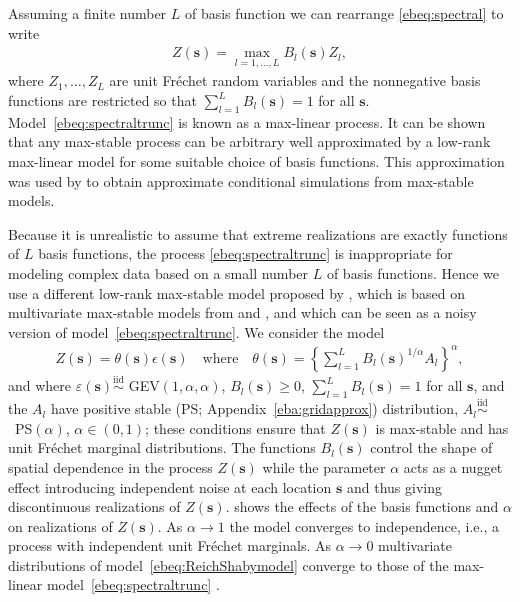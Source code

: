 \documentclass[12pt]{article}
\newcommand{\bs}{\ensuremath{\mathbf{s}}}
\newcommand{\iid}{\stackrel{\mathrm{iid}}{\sim}}
\newcommand{\aref}[1]{Appendix~\ref{#1}}
\begin{document}
Assuming a finite number $L$ of basis function we can rearrange \eqref{ebeq:spectral} to write
\begin{align} \label{ebeq:spectraltrunc}
 Z(\bs) = \max_{l = 1,\ldots,L} B_l(\bs)Z_{l},
\end{align}
where $Z_1,\ldots,Z_L$ are unit Fr\'echet random variables and the nonnegative basis functions are restricted so that $\sum_{l = 1}^L B_l(\bs) = 1$ for all $\bs$. Model~\eqref{ebeq:spectraltrunc} is known as a max-linear process. It can be shown that any max-stable process can be arbitrary well approximated by a low-rank max-linear model for some suitable choice of basis functions. This approximation was used by \citet{Wang2011} to obtain approximate conditional simulations from max-stable models.

Because it is unrealistic to assume that extreme realizations are exactly functions of $L$ basis functions, the process \eqref{ebeq:spectraltrunc} is inappropriate for modeling complex data based on a small number $L$ of basis functions. Hence we use a different low-rank max-stable model proposed by \citet{Reich2012}, which is based on multivariate max-stable models from \citet{Fougeres.etal:2009} and \citet{Fougeres.etal:2013}, and which can be seen as a noisy version of model~\eqref{ebeq:spectraltrunc}. We consider the model
\begin{align}\label{ebeq:ReichShabymodel}
  Z(\bs) = \theta(\bs) \epsilon(\bs) \quad \mathrm{where} \quad \theta(\bs) = \left\{\sum_{l=1}^L B_{l}(\bs)^{1/\alpha}A_{l}\right\}^{\alpha},
\end{align}
and where $\varepsilon(\bs)\iid$ GEV$(1,\alpha,\alpha)$, $B_{l}(\bs)\geq0$, $\sum_{l=1}^LB_{l}(\bs)=1$ for all $\bs$, and the $A_{l}$ have positive stable (PS; \aref{eba:gridapprox}) distribution, \mbox{$A_{l}\iid$ PS$(\alpha)$}, $\alpha\in(0,1)$; these conditions ensure that $Z(\bs)$ is max-stable and has unit Fr\'echet marginal distributions. The functions $B_l(\bs)$ control the shape of spatial dependence in the process $Z(\bs)$ while the parameter $\alpha$ acts as a nugget effect introducing independent noise at each location $\bs$ and thus giving discontinuous realizations of $Z(\bs)$. \citet[Fig.~1]{Reich2012} shows the effects of the basis functions and $\alpha$ on realizations of $Z(\bs)$. As $\alpha\rightarrow1$ the model converges to independence, i.e., a process with independent unit Fr\'echet marginals.
As $\alpha\rightarrow 0$ multivariate distributions of model~\eqref{ebeq:ReichShabymodel} converge to those of the max-linear model~\eqref{ebeq:spectraltrunc} \citep[][Section~3]{Reich2012}.
\end{document}
